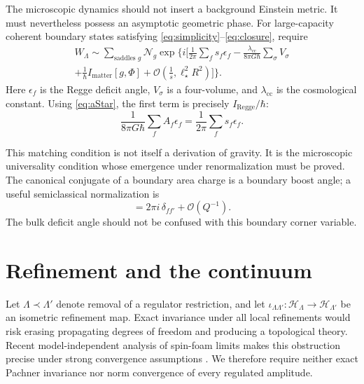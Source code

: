 \documentclass[11pt]{article}
\theoremstyle{remark}
\newcommand{\cH}{\mathcal H}
\newcommand{\order}{\mathcal O}
\begin{document}
The microscopic dynamics should not insert a background Einstein metric.
It must nevertheless possess an asymptotic geometric phase.  For
large-capacity coherent boundary states satisfying
\eqref{eq:simplicity}--\eqref{eq:closure}, require
\begin{equation}
\begin{split}
  W_\Lambda
  \sim
  \sum_{\text{saddles }g}
  \mathcal N_g
  \exp\Bigg\{i\Bigg[
    \frac{1}{2\pi}\sum_f s_f\epsilon_f
    -\frac{\lambda_{\mathrm{cc}}}{8\pi G\hbar}
       \sum_\sigma V_\sigma\\
    +\frac{1}{\hbar}I_{\mathrm{matter}}[g,\Phi]
    +\order\!\left(\frac{1}{s},\ell_\star^2R^2\right)
  \Bigg]\Bigg\}.
  \label{eq:ReggeAsymptotic}
\end{split}
\end{equation}
Here \(\epsilon_f\) is the Regge deficit angle, \(V_\sigma\) is a
four-volume, and \(\lambda_{\mathrm{cc}}\) is the cosmological constant.
Using \eqref{eq:aStar}, the first term is precisely
\(I_{\mathrm{Regge}}/\hbar\):
\begin{equation}
  \frac{1}{8\pi G\hbar}\sum_f A_f\epsilon_f
  =\frac{1}{2\pi}\sum_f s_f\epsilon_f.
\end{equation}

This matching condition is not itself a derivation of gravity.  It is the
microscopic universality condition whose emergence under renormalization
must be proved.  The canonical conjugate of a boundary area charge is a
boundary boost angle; a useful semiclassical normalization is
\begin{equation}
  [\widehat\eta_f,\widehat s_{f'}]
  =2\pi i\,\delta_{ff'}+\order(Q^{-1}).
  \label{eq:cornerCanonical}
\end{equation}
The bulk deficit angle should not be confused with this boundary corner
variable.

\section{Refinement and the continuum}

Let \(\Lambda\prec\Lambda'\) denote removal of a regulator restriction,
and let
\(\iota_{\Lambda\Lambda'}:\cH_\Lambda\rightarrow\cH_{\Lambda'}\)
be an isometric refinement map.  Exact invariance under all local
refinements would risk erasing propagating degrees of freedom and
producing a topological theory.  Recent model-independent analysis of
spin-foam limits makes this obstruction precise under strong convergence
assumptions \cite{Bruno2026}.  We therefore require neither exact Pachner
invariance nor norm convergence of every regulated amplitude.
\end{document}

